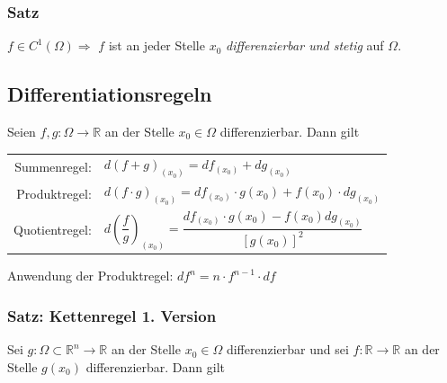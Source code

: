 \documentclass[a4paper, fontsize = 8pt, landscape]{scrartcl}
\newcommand{\R}[0]{\mathbb{R}}
\begin{document}
\begin{multicols*}{3}
    \subsubsection{Satz}

    $f \in C^1(\Omega) \Rightarrow$ $f$ ist an jeder Stelle $x_0$ \emph{differenzierbar und stetig} auf $\Omega$.




    \subsection{Differentiationsregeln}

    Seien $f,g: \Omega \to \R$ an der Stelle $x_0 \in \Omega$ differenzierbar. Dann gilt

    \begin{center}
        \renewcommand{\arraystretch}{2}
        \begin{tabular}{r l} \toprule
            Summenregel:   & \hspace*{-10pt} $d(f + g)_{(x_0)} = df_{(x_0)} + dg_{(x_0)}$                                                           \\
            Produktregel:  & \hspace*{-10pt} $d(f \cdot g)_{(x_0)} = df_{(x_0)} \cdot g(x_0) + f(x_0) \cdot dg_{(x_0)}$                             \\
            Quotientregel: & \hspace*{-10pt} $d\left(\dfrac{f}{g}\right)_{(x_0)} = \dfrac{df_{(x_0)} \cdot g(x_0) - f(x_0) dg_{(x_0)}}{[g(x_0)]^2}$ \\ \bottomrule
        \end{tabular}
    \end{center}

    Anwendung der Produktregel: $d f^n = n \cdot f^{n - 1} \cdot df$


    \subsubsection{Satz: Kettenregel 1. Version}

    Sei $g: \Omega \subset \R^n \to \R$ an der Stelle $x_0 \in \Omega$ differenzierbar und sei $f: \R \to \R$ an der Stelle $g(x_0)$ differenzierbar. Dann gilt


\end{multicols*}
\end{document}
